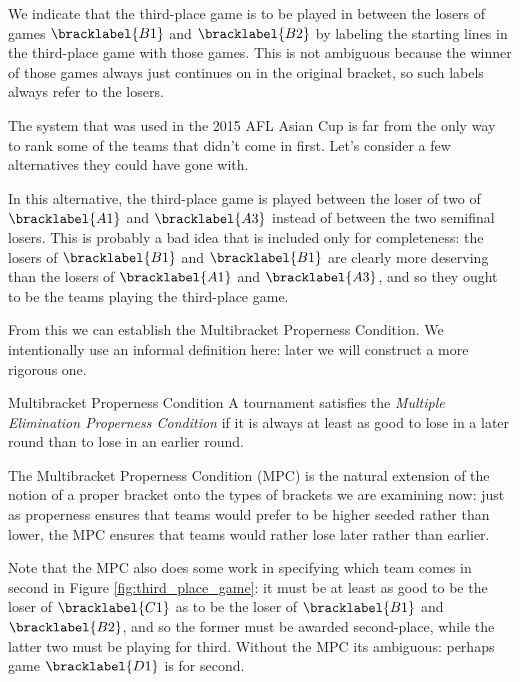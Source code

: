 {    We indicate that the third-place game is to be played in between the losers of games $\bracklabel{B1}$ and $\bracklabel{B2}$ by labeling the starting lines in the third-place game with those games. This is not ambiguous because the winner of those games always just continues on in the original bracket, so such labels always refer to the losers.

    The system that was used in the 2015 AFL Asian Cup is far from the only way to rank some of the teams that didn't come in first. Let's consider a few alternatives they could have gone with.


    In this alternative, the third-place game is played between the loser of two of $\bracklabel{A1}$ and $\bracklabel{A3}$ instead of between the two semifinal losers. This is probably a bad idea that is included only for completeness: the losers of $\bracklabel{B1}$ and $\bracklabel{B1}$ are clearly more deserving than the losers of $\bracklabel{A1}$ and $\bracklabel{A3}$, and so they ought to be the teams playing the third-place game.
    
    From this we can establish the Multibracket Properness Condition. We intentionally use an informal definition here: later we will construct a more rigorous one.
    
    \begin{definition}{Multibracket Properness Condition}{} 
        A tournament satisfies the \textit{Multiple Elimination Properness Condition} if it is always at least as good to lose in a later round than to lose in an earlier round.
    \end{definition}

    The Multibracket Properness Condition (MPC) is the natural extension of the notion of a proper bracket onto the types of brackets we are examining now: just as properness ensures that teams would prefer to be higher seeded rather than lower, the MPC ensures that teams would rather lose later rather than earlier.

    Note that the MPC also does some work in specifying which team comes in second in Figure \ref{fig:third_place_game}: it must be at least as good to be the loser of $\bracklabel{C1}$ as to be the loser of $\bracklabel{B1}$ and $\bracklabel{B2}$, and so the former must be awarded second-place, while the latter two must be playing for third. Without the MPC its ambiguous: perhaps game $\bracklabel{D1}$ is for second.
    

}
